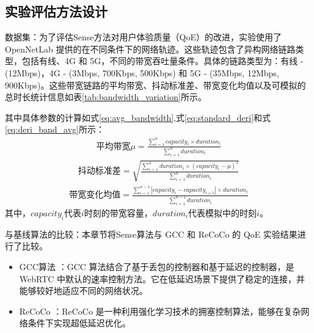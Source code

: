 \subsection{实验评估方法设计}
数据集：为了评估Sense方法对用户体验质量（QoE）的改进，实验使用了 OpenNetLab 提供的在不同条件下的网络轨迹。这些轨迹包含了异构网络链路类型，包括有线、4G 和 5G，不同的带宽吞吐量条件。具体的链路类型为：有线 - (12Mbps)，4G - (3Mbps, 700Kbps, 500Kbps) 和 5G - (35Mbps, 12Mbps, 900Kbps)。这些带宽链路的平均带宽、抖动标准差、带宽变化均值以及可模拟的总时长统计信息如表\ref{tab:bandwidth_variation}所示。


其中具体参数的计算如式\eqref{eq:avg_bandwidth},式\eqref{eq:standard_deri}和式\eqref{eq:deri_band_avg}所示：
\begin{equation}
\begin{aligned}
\text{平均带宽} \mu = \frac{\sum_{i=1}^{n} capacity_i \times duration_i}{\sum_{i=1}^{n} duration_i}
\end{aligned}
\label{eq:avg_bandwidth}
\end{equation}
\begin{equation}
\begin{aligned}
\text{抖动标准差} = \sqrt{\frac{\sum_{i=1}^{n} duration_i \times (capacity_i - \mu)^2}{\sum_{i=1}^{n} duration_i}}
\end{aligned}
\label{eq:standard_deri}
\end{equation}
\begin{equation}
\begin{aligned}
\text{带宽变化均值} = \frac{\sum_{i=1}^{n-1} |capacity_i - capacity_{i+1}| \times duration_i}{\sum_{i=1}^{n-1} duration_i}
\end{aligned}
\label{eq:deri_band_avg}
\end{equation}
其中，$capacity_i$代表$i$时刻的带宽容量，$duration_i$代表模拟中的时刻$i$。

与基线算法的比较：本章节将Sense算法与 GCC 和 ReCoCo 的 QoE 实验结果进行了比较。

\begin{itemize}
    \item GCC算法 \cite{carlucci2016analysis}：GCC 算法结合了基于丢包的控制器和基于延迟的控制器，是 WebRTC 中默认的速率控制方法。它在低延迟场景下提供了稳定的连接，并能够较好地适应不同的网络状况。
    
    \item ReCoCo \cite{markudova2023recoco}：ReCoCo 是一种利用强化学习技术的拥塞控制算法，能够在复杂网络条件下实现超低延迟优化。
\end{itemize}


